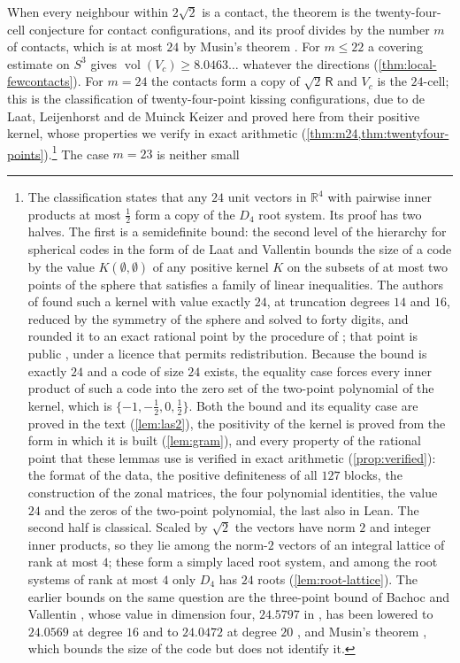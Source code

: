 \documentclass[11pt,reqno]{amsart}
\renewcommand{\_}{\origunderscore\allowbreak}
\numberwithin{equation}{section}
\theoremstyle{plain}
\theoremstyle{definition}
\theoremstyle{remark}
\newcommand{\Rt}{\mathsf{R}}                 %
\DeclareMathOperator{\vol}{vol}
\begin{document}
When every neighbour within $2\sqrt2$ is a contact, the theorem is the
twenty-four-cell conjecture for contact configurations, and its proof
divides by the number $m$ of contacts, which is at most $24$ by Musin's
theorem \cite{Mus08}. For $m\le22$ a covering estimate on $S^3$ gives
$\vol(V_c)\ge8.0463\ldots$ whatever the directions
(\cref{thm:local-fewcontacts}). For $m=24$ the contacts form a copy of
$\sqrt2\,\Rt$ and $V_c$ is the $24$-cell; this is the classification of
twenty-four-point kissing configurations, due to de Laat, Leijenhorst and
de Muinck Keizer \cite{LLM24} and proved here from their positive kernel,
whose properties we verify in exact arithmetic
(\cref{thm:m24,thm:twentyfour-points}).\footnote{The classification
  states that any $24$ unit vectors in $\mathbb{R}^4$ with pairwise inner
  products at most $\frac12$ form a copy of the $D_4$ root system. Its
  proof has two halves. The first is a semidefinite bound: the second level
  of the hierarchy for spherical codes in the form of de Laat and Vallentin
  \cite{dLV15} bounds the size of a code by the value $K(\emptyset,\emptyset)$
  of any positive kernel $K$ on the subsets of at most two points of the
  sphere that satisfies a family of linear inequalities. The authors of
  \cite{LLM24} found such a kernel with value exactly $24$, at truncation
  degrees $14$ and $16$, reduced by the symmetry of the sphere and solved to
  forty digits, and rounded it to an exact rational point by the procedure
  of \cite{CdLL24}; that point is public \cite{LLM24data}, under a licence
  that permits redistribution. Because the bound is exactly $24$ and a code
  of size $24$ exists, the equality case forces every inner product of such
  a code into the zero set of the two-point polynomial of the kernel, which
  is $\{-1,-\frac12,0,\frac12\}$. Both the bound and its equality case are
  proved in the text (\cref{lem:las2}), the positivity of the kernel is
  proved from the form in which it is built (\cref{lem:gram}), and every
  property of the rational point that these lemmas use is verified in exact
  arithmetic (\cref{prop:verified}): the format of the data, the positive
  definiteness of all $127$ blocks, the construction of the zonal matrices,
  the four polynomial identities, the value $24$ and the zeros of the
  two-point polynomial, the last also in Lean. The second half is
  classical. Scaled by $\sqrt2$ the vectors have norm $2$ and integer inner
  products, so they lie among the norm-$2$ vectors of an integral lattice
  of rank at most $4$; these form a simply laced root system, and among the
  root systems of rank at most $4$ only $D_4$ has $24$ roots
  (\cref{lem:root-lattice}). The earlier bounds on the same question are the
  three-point bound of Bachoc and Vallentin \cite{BV08}, whose value in
  dimension four, $24.5797$ in \cite{BV08}, has been lowered to $24.0569$
  at degree $16$ \cite{MV10,MO18} and to $24.0472$ at degree $20$
  \cite{Lei25}, and Musin's theorem \cite{Mus08}, which bounds the size of
  the code but does not identify it.} The case $m=23$ is neither small
\end{document}

